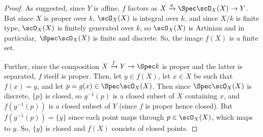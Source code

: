 \begin{proof}
	As suggested, since $Y$ is affine, $f$ factors as $X \xrightarrow{g} \Spec\scO_X(X) \to Y$. But since $X$ is proper over $k$, $\scO_X(X)$ is integral over $k$, and since $X/k$ is finite type, $\scO_X(X)$ is finitely generated over $k$, so $\scO_X(X)$ is Artinian and in particular, $\Spec\scO_X(X)$ is finite and discrete. So, the image $f(X)$ is a finite set.
	
	Further, since the composition $X \xrightarrow{f} Y \to \Spec k$ is proper and the latter is separated, $f$ itself is proper. Then, let $y \in f(X)$, let $x \in X$ be such that $f(x) = y$, and let $p = g(x) \in \Spec\scO_X(X)$. Then since $\Spec\scO_X(X)$ is discrete, $\{p\}$ is closed, so $g^{-1}(p)$ is a closed subset of $X$ containing $x$, and $f(g^{-1}(p))$ is a closed subset of $Y$ (since $f$ is proper hence closed). But $f(g^{-1}(p)) = \{y\}$ since each point maps through $p \in \scO_X(X)$, which maps to $y$. So, $\{y\}$ is closed and $f(X)$ consists of closed points.
\end{proof}
